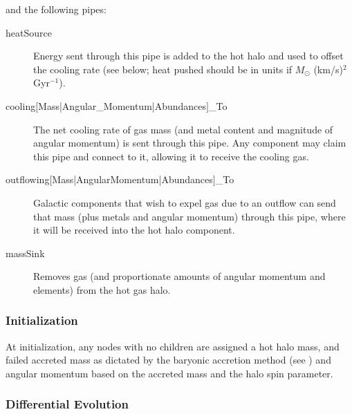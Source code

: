 and the following pipes:
\begin{description}
 \item [{\normalfont \ttfamily heatSource}] Energy sent through this pipe is added to the hot halo and used to offset the cooling rate (see below; heat pushed should be in units if $M_\odot$ (km/s)$^2$ Gyr$^{-1}$).
 \item [{\normalfont \ttfamily cooling$[$Mass|Angular\_Momentum|Abundances$]$\_To}] The net cooling rate of gas mass (and metal content and magnitude of angular momentum) is sent through this pipe. Any \gls{component} may claim this pipe and connect to it, allowing it to receive the cooling gas.
 \item [{\normalfont \ttfamily outflowing$[$Mass|AngularMomentum|Abundances$]$\_To}] Galactic components that wish to expel gas due to an outflow can send that mass (plus metals and angular momentum) through this pipe, where it will be received into the hot halo component. 
 \item [{\normalfont \ttfamily massSink}] Removes gas (and proportionate amounts of angular momentum and elements) from the hot gas halo.
\end{description}

\subsubsection{Initialization}

At initialization, any nodes with no children are assigned a hot halo mass, and failed accreted mass as dictated by the baryonic accretion method (see ) and angular momentum based on the accreted mass and the halo spin parameter.

\subsubsection{Differential Evolution}

